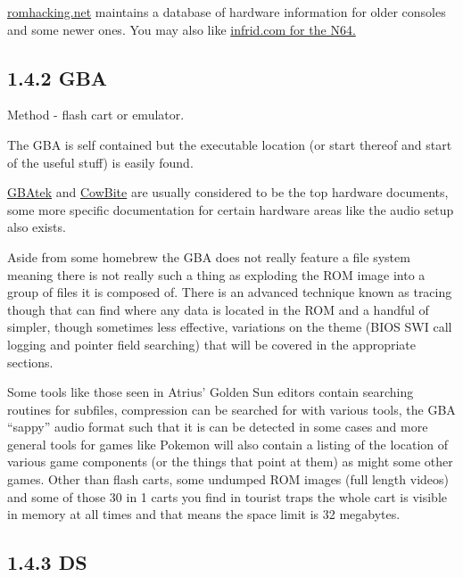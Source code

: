 \documentclass[
]{book}
\begin{document}
\href{http://www.romhacking.net/?page=documents\&category=12\&platform=\&game=\&author=\&perpage=20\&level=\&title=\&desc=\&docsearch=Go}{romhacking.net} maintains a database of hardware information for older consoles and some newer ones. You may also like \href{http://infrid.com/rcp64/documents.php}{infrid.com for the N64.}

\hypertarget{gba}{%
\subsection{1.4.2 GBA}\label{gba}}

Method - flash cart or emulator.

The GBA is self contained but the executable location (or start thereof and start of the useful stuff) is easily found.

\href{http://problemkaputt.de/gbatek.htm}{GBAtek} and \href{http://www.cs.rit.edu/~tjh8300/CowBite/CowBiteSpec.htm}{CowBite} are usually considered to be the top hardware documents, some more specific documentation for certain hardware areas like the audio setup also exists.

Aside from some homebrew the GBA does not really feature a file system meaning there is not really such a thing as exploding the ROM image into a group of files it is composed of. There is an advanced technique known as tracing though that can find where any data is located in the ROM and a handful of simpler, though sometimes less effective, variations on the theme (BIOS SWI call logging and pointer field searching) that will be covered in the appropriate sections.

Some tools like those seen in Atrius' Golden Sun editors contain searching routines for subfiles, compression can be searched for with various tools, the GBA ``sappy'' audio format such that it is can be detected in some cases and more general tools for games like Pokemon will also contain a listing of the location of various game components (or the things that point at them) as might some other games. Other than flash carts, some undumped ROM images (full length videos) and some of those 30 in 1 carts you find in tourist traps the whole cart is visible in memory at all times and that means the space limit is 32 megabytes.

\hypertarget{ds}{%
\subsection{1.4.3 DS}\label{ds}}
\end{document}
